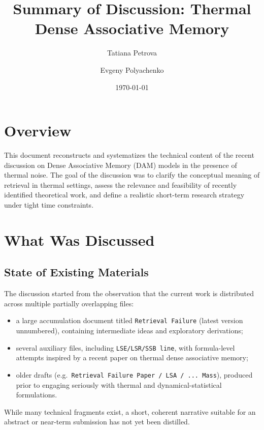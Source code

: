 \documentclass[11pt,a4paper]{article}
\title{Summary of Discussion: Thermal Dense Associative Memory}
\author{Tatiana Petrova \and Evgeny Polyachenko}
\date{\today}
\begin{document}
\maketitle

\section*{Overview}

This document reconstructs and systematizes the technical content of the recent discussion on Dense Associative Memory (DAM) models in the presence of thermal noise. The goal of the discussion was to clarify the conceptual meaning of retrieval in thermal settings, assess the relevance and feasibility of recently identified theoretical work, and define a realistic short-term research strategy under tight time constraints.

\section{What Was Discussed}

\subsection{State of Existing Materials}

The discussion started from the observation that the current work is distributed across multiple partially overlapping files:
\begin{itemize}
    \item a large accumulation document titled \texttt{Retrieval Failure} (latest version unnumbered), containing intermediate ideas and exploratory derivations;
    \item several auxiliary files, including \texttt{LSE/LSR/SSB line}, with formula-level attempts inspired by a recent paper on thermal dense associative memory;
    \item older drafts (e.g.\ \texttt{Retrieval Failure Paper / LSA / ... Mass}), produced prior to engaging seriously with thermal and dynamical-statistical formulations.
\end{itemize}

While many technical fragments exist, a short, coherent narrative suitable for an abstract or near-term submission has not yet been distilled.
\end{document}
